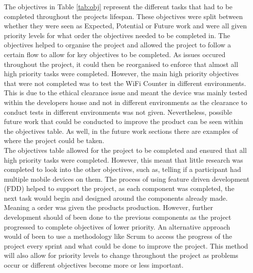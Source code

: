 \documentclass{report}
\begin{document}
 The objectives in Table \ref{tab:obj} represent the different tasks that had to be completed throughout the projects lifespan. These objectives were split between whether they were seen as Expected, Potential or Future work and were all given priority levels for what order the objectives needed to be completed in. The objectives helped to organise the project and allowed the project to follow a certain flow to allow for key objectives to be completed. As issues occured throughout the project, it could then be reorganised to enforce that almost all high priority tasks were completed. However, the main high priority objectives that were not completed was to test the WiFi Counter in different environments. This is due to the ethical clearance issue and meant the device was mainly tested within the developers house and not in different environments as the clearance to conduct tests in different environments was not given. Nevertheless, possible future work that could be conducted to improve the product can be seen within the objectives table. As well, in the future work sections there are examples of where the project could be taken.\\ \newline 
 The objectives table allowed for the project to be completed and ensured that all high priority tasks were completed. However, this meant that little research was completed to look into the other objectives, such as, telling if a participant had multiple mobile devices on them. The process of using feature driven development (FDD) helped to support the project, as each component was completed, the next task would begin and designed around the components already made. Meaning a order was given the products production. However, further development should of been done to the previous components as the project progressed to complete objectives of lower priority. An alternative approach would of been to use a methodology like Scrum\cite{Scrum} to access the progress of the project every sprint and what could be done to improve the project. This method will also allow for priority levels to change throughout the project as problems occur or different objectives become more or less important. \\ \newline 
\end{document}
